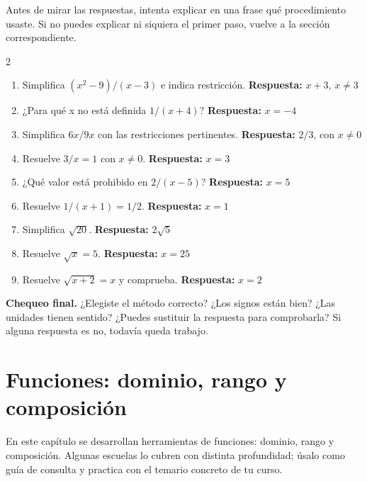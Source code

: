 \documentclass[10pt,oneside,openany]{book}
\begin{document}
Antes de mirar las respuestas, intenta explicar en una frase qué procedimiento usaste. Si no puedes explicar ni siquiera el primer paso, vuelve a la sección correspondiente.

\begin{multicols}{2}\begin{enumerate}

\item Simplifica $(x^2-9)/(x-3)$ e indica restricción. \textbf{Respuesta:} $x+3$, $x\neq3$

\item ¿Para qué x no está definida $1/(x+4)$? \textbf{Respuesta:} $x=-4$

\item Simplifica $6x/9x$ con las restricciones pertinentes. \textbf{Respuesta:} $2/3$, con $x\neq0$

\item Resuelve $3/x=1$ con $x\neq0$. \textbf{Respuesta:} $x=3$

\item ¿Qué valor está prohibido en $2/(x-5)$? \textbf{Respuesta:} $x=5$

\item Resuelve $1/(x+1)=1/2$. \textbf{Respuesta:} $x=1$

\item Simplifica $\sqrt{20}$. \textbf{Respuesta:} $2\sqrt5$

\item Resuelve $\sqrt{x}=5$. \textbf{Respuesta:} $x=25$

\item Resuelve $\sqrt{x+2}=x$ y comprueba. \textbf{Respuesta:} $x=2$

\end{enumerate}\end{multicols}

\begin{idea}\textbf{Chequeo final.} ¿Elegiste el método correcto? ¿Los signos están bien? ¿Las unidades tienen sentido? ¿Puedes sustituir la respuesta para comprobarla? Si alguna respuesta es no, todavía queda trabajo.\end{idea}



\chapter{Funciones: dominio, rango y composición}

\begin{idea}
En este capítulo se desarrollan herramientas de funciones: dominio, rango y composición. Algunas escuelas lo cubren con distinta profundidad; úsalo como guía de consulta y practica con el temario concreto de tu curso.
\end{idea}
\end{document}
